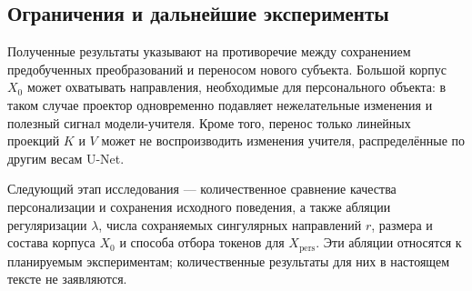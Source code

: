\documentclass{article}
\newcommand{\Xp}{X_{\mathrm{pers}}}
\newcommand{\Xo}{X_{0}}
\begin{document}
\subsection{Ограничения и дальнейшие эксперименты}

Полученные результаты указывают на противоречие между сохранением
предобученных преобразований и переносом нового субъекта.
Большой корпус $\Xo$ может охватывать направления, необходимые
для персонального объекта: в таком случае проектор одновременно
подавляет нежелательные изменения и полезный сигнал модели-учителя.
Кроме того, перенос только линейных проекций $K$ и $V$ может
не воспроизводить изменения учителя, распределённые по другим весам U-Net.

Следующий этап исследования --- количественное сравнение качества
персонализации и сохранения исходного поведения, а также абляции
регуляризации $\lambda$, числа сохраняемых сингулярных направлений $r$,
размера и состава корпуса $\Xo$ и способа отбора токенов для $\Xp$.
Эти абляции относятся к планируемым экспериментам; количественные
результаты для них в настоящем тексте не заявляются.



\end{document}
